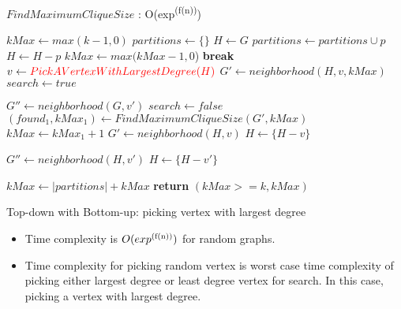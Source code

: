 \documentclass[landscape]{slides}
\begin{document}
\begin{algorithm}
	\caption{$FindMaximumCliqueSize$ : O(exp\textsuperscript{(f(n))})}
	\begin{algorithmic}[1]
		\State $kMax \gets max(k - 1, 0)$
		\State $partitions \gets \{\}$
		\State $H \gets G$
		\State $partitions \gets partitions \cup p$
		\State $H \gets H - p$
		\State $kMax \gets max(kMax - 1, 0$)
		\EndWhile
		\State \textbf{break}
		\EndIf
		\State $v \gets {\color{red} PickAVertexWithLargestDegree(H)}$
		\State $G' \gets neighborhood(H, v, kMax)$
		\State $search \gets true$
	\end{algorithmic}
\end{algorithm}


\begin{algorithm}
	\begin{algorithmic}[1]
		\State $G'' \gets neighborhood(G, v')$
		\State $search \gets false$
		\EndIf
		\EndFor
		\State $(found_1, kMax_1) \gets FindMaximumCliqueSize(G', kMax)$
		\State $kMax \gets kMax_1 + 1$
		\EndIf
		\EndIf
		\EndIf
		\State $G' \gets neighborhood(H, v)$
		\State $H \gets \{H - v\}$
		
			\State $G'' \gets neighborhood(H, v')$
				\State $H \gets \{H - v'\}$
			\EndIf
		\EndFor
	\end{algorithmic}
\end{algorithm}


\begin{algorithm}
	\begin{algorithmic}[1]
		\EndWhile
		\State $kMax \gets |partitions| + kMax$
		\State \textbf{return} $(kMax >= k, kMax)$
		\EndFunction
	\end{algorithmic}
\end{algorithm}

\clearpage

\begin{slide}
	\begin{center}{\large Top-down with Bottom-up: picking vertex with largest degree}\end{center}
	\begin{itemize}
		\setlength{\itemsep}{0pt}
		\setlength{\parskip}{20pt}
		\setlength{\parsep}{0pt}
		\item Time complexity is $O(exp\textsuperscript{(f(n))})$ for random graphs.
		\item Time complexity for picking random vertex is worst case time complexity of picking either largest degree or least degree vertex for search. In this case, picking a vertex with largest degree.
	\end{itemize}
\end{slide}
\end{document}
